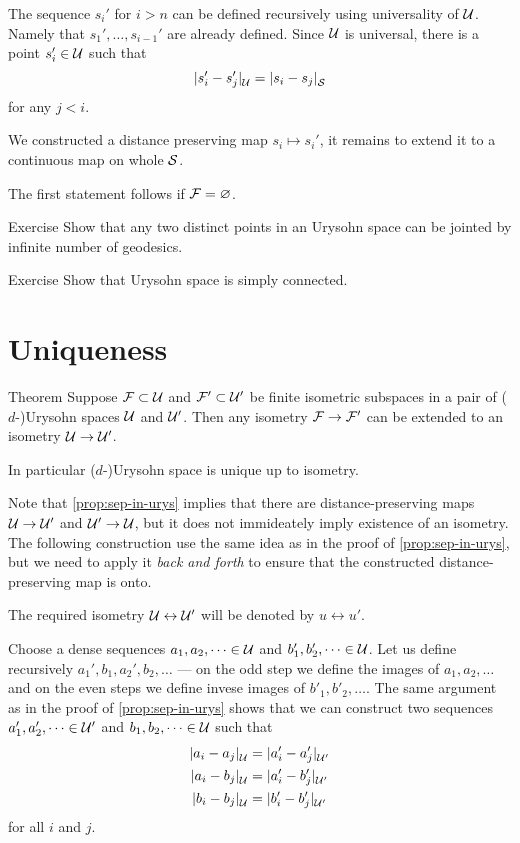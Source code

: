 The sequence $s_i'$ for $i>n$ can be defined recursively using universality of $\mathcal{U}$.
Namely that $s_1',\dots,s_{i-1}'$ are already defined.
Since $\mathcal{U}$ is universal, there is a point $s_i'\in \mathcal{U}$ such that
\[\dist{s_i'}{s_j'}{\spc{U}}=\dist{s_i}{s_j}{\spc{S}}\]
for any $j<i$.

We constructed a distance preserving map $s_i\mapsto s_i'$, it remains to extend it to a continuous map on whole $\mathcal{S}$.

The first statement follows if $\mathcal{F}=\varnothing$.\qeds

\begin{thm}{Exercise}\label{ex:geodesics-urysohn}
Show that any two distinct points in an Urysohn space can be jointed by infinite number of geodesics.
\end{thm}

\begin{thm}{Exercise}\label{ex:sc-urysohn}
Show that Urysohn space is simply connected.
\end{thm}

\section{Uniqueness}

\begin{thm}{Theorem}\label{thm:urysohn-unique}
Suppose $\mathcal{F}\subset \mathcal{U}$ and $\mathcal{F}'\subset \mathcal{U}'$ be finite isometric subspaces in a pair of ($d$-)Urysohn spaces $\mathcal{U}$ and $\mathcal{U}'$.
Then any isometry $\mathcal{F}\to \mathcal{F}'$ can be extended to an isometry $\mathcal{U}\to \mathcal{U}'$.

In particular ($d$-)Urysohn space is unique up to isometry.
\end{thm}

Note that \ref{prop:sep-in-urys} implies that there are distance-preserving maps $\mathcal{U}\to \mathcal{U}'$ and $\mathcal{U}'\to \mathcal{U}$,
but it does not immideately imply existence of an isometry.
The following construction use the same idea as in the proof of \ref{prop:sep-in-urys}, but we need to apply it \emph{back and forth} to ensure that the constructed distance-preserving map is onto.

The required isometry $\mathcal{U}\leftrightarrow \mathcal{U}'$ will be denoted by $u \leftrightarrow u'$.

Choose a dense sequences $a_1,a_2,\dots\in \mathcal{U}$ and $b'_1,b'_2,\dots\in \mathcal{U}$.
Let us define recursively $a_1',b_1, a_2', b_2,\dots$ --- on the odd step we define the images of $a_1,a_2,\dots$ and on the even steps we define invese images of $b'_1,b'_2,\dots$.
The same argument as in the proof of \ref{prop:sep-in-urys} shows that we can construct two sequences $a_1',a_2',\dots\in \mathcal{U}'$ and $b_1,b_2,\dots\in \mathcal{U}$ such that
\begin{align*}
\dist{a_i}{a_j}{\spc{U}}&=\dist{a_i'}{a_j'}{\spc{U}'}
\\
\dist{a_i}{b_j}{\spc{U}}&=\dist{a_i'}{b_j'}{\spc{U}'}
\\
\dist{b_i}{b_j}{\spc{U}}&=\dist{b_i'}{b_j'}{\spc{U}'}
\end{align*}
for all $i$ and $j$.

